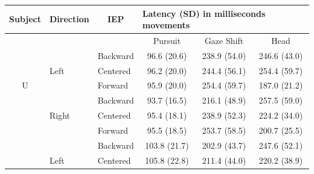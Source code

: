 \documentclass[12pt]{article}
\begin{document}
\begin{table}[h]
\begin{tabular}{@{}lllccc@{}}
\toprule
Subject               & Direction                    & \multicolumn{1}{c}{IEP}          & \multicolumn{3}{l}{Latency (SD) in milliseconds movements}                                                         \\ \midrule
                      &                              &                                  & Pursuit                              & Gaze Shift                           & Head                                 \\
                      & \cellcolor[HTML]{EFEFEF}     & \cellcolor[HTML]{EFEFEF}Backward & \cellcolor[HTML]{EFEFEF}96.6 (20.6)  & \cellcolor[HTML]{EFEFEF}238.9 (54.0) & \cellcolor[HTML]{EFEFEF}246.6 (43.0) \\
                      & \cellcolor[HTML]{EFEFEF}Left & \cellcolor[HTML]{EFEFEF}Centered & \cellcolor[HTML]{EFEFEF}96.2 (20.0)  & \cellcolor[HTML]{EFEFEF}244.4 (56.1) & \cellcolor[HTML]{EFEFEF}254.4 (59.7) \\
\multicolumn{1}{c}{U} & \cellcolor[HTML]{EFEFEF}     & \cellcolor[HTML]{EFEFEF}Forward  & \cellcolor[HTML]{EFEFEF}95.9 (20.0)  & \cellcolor[HTML]{EFEFEF}254.4 (59.7) & \cellcolor[HTML]{EFEFEF}187.0 (21.2) \\
                      &                              & Backward                         & 93.7 (16.5)                          & 216.1 (48.9)                         & 257.5 (59.0)                         \\
                      & Right                        & Centered                         & 95.4 (18.1)                          & 238.9 (52.3)                         & 224.2 (34.0)                         \\
                      &                              & Forward                          & 95.5 (18.5)                          & 253.7 (58.5)                         & 200.7 (25.5)                         \\
                      & \cellcolor[HTML]{EFEFEF}     & \cellcolor[HTML]{EFEFEF}Backward & \cellcolor[HTML]{EFEFEF}103.8 (21.7) & \cellcolor[HTML]{EFEFEF}202.9 (43.7) & \cellcolor[HTML]{EFEFEF}247.6 (52.1) \\
                      & \cellcolor[HTML]{EFEFEF}Left & \cellcolor[HTML]{EFEFEF}Centered & \cellcolor[HTML]{EFEFEF}105.8 (22.8) & \cellcolor[HTML]{EFEFEF}211.4 (44.0) & \cellcolor[HTML]{EFEFEF}220.2 (38.9) \\

\end{tabular}
\end{table}
\end{document}

